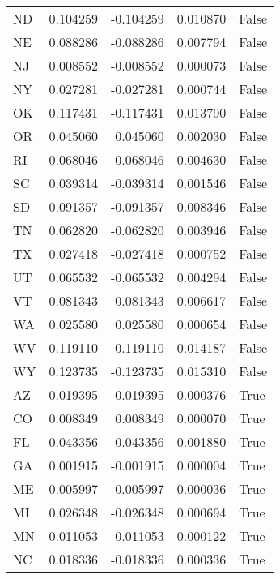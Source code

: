 \begin{table}
\begin{tabular}{lrrrl}
      ND &   0.104259 & -0.104259 &       0.010870 &         False \\
      NE &   0.088286 & -0.088286 &       0.007794 &         False \\
      NJ &   0.008552 & -0.008552 &       0.000073 &         False \\
      NY &   0.027281 & -0.027281 &       0.000744 &         False \\
      OK &   0.117431 & -0.117431 &       0.013790 &         False \\
      OR &   0.045060 &  0.045060 &       0.002030 &         False \\
      RI &   0.068046 &  0.068046 &       0.004630 &         False \\
      SC &   0.039314 & -0.039314 &       0.001546 &         False \\
      SD &   0.091357 & -0.091357 &       0.008346 &         False \\
      TN &   0.062820 & -0.062820 &       0.003946 &         False \\
      TX &   0.027418 & -0.027418 &       0.000752 &         False \\
      UT &   0.065532 & -0.065532 &       0.004294 &         False \\
      VT &   0.081343 &  0.081343 &       0.006617 &         False \\
      WA &   0.025580 &  0.025580 &       0.000654 &         False \\
      WV &   0.119110 & -0.119110 &       0.014187 &         False \\
      WY &   0.123735 & -0.123735 &       0.015310 &         False \\
      AZ &   0.019395 & -0.019395 &       0.000376 &          True \\
      CO &   0.008349 &  0.008349 &       0.000070 &          True \\
      FL &   0.043356 & -0.043356 &       0.001880 &          True \\
      GA &   0.001915 & -0.001915 &       0.000004 &          True \\
      ME &   0.005997 &  0.005997 &       0.000036 &          True \\
      MI &   0.026348 & -0.026348 &       0.000694 &          True \\
      MN &   0.011053 & -0.011053 &       0.000122 &          True \\
      NC &   0.018336 & -0.018336 &       0.000336 &          True \\

\end{tabular}
\end{table}
